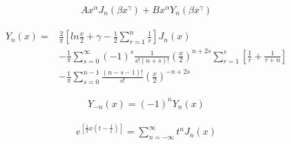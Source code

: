 \[\begin{align} \label{thrm4.12(b)} Ax^{\alpha}J_n(\beta x^{\gamma})+Bx^{\alpha}Y_n(\beta x^\gamma) \end{align}\]

\[\begin{align} \label{thrm4.3} Y_n(x) = & \frac2\pi\left[ ln\frac x2 + \gamma -\frac 12 \sum_{r=1}^n\frac 1r \right]J_n(x) \\\ & -\frac 1\pi\sum_{s=0}^\infty (-1)^s\frac{1}{s!(n+s)!}\left( \frac x2 \right) ^{n+2s}\sum_{r=1}^s\left[ \frac 1r + \frac 1{r+n} \right] \\\ & - \frac 1\pi \sum_{s=0}^{n-1}\frac{(n-s-1)!}{s!}\left( \frac x2 \right)^{-n+2s} \end{align}\]

\[\begin{align} \label{thrm4.4} Y_{-n}(x) = (-1)^nY_n(x) \end{align}\]

\[\begin{align} \label{thrm4.5} e^{\left[ \frac 12x(t-\frac 1t) \right]} = \sum_{n= -\infty}^{\infty}t^nJ_n(x) \end{align}\]

